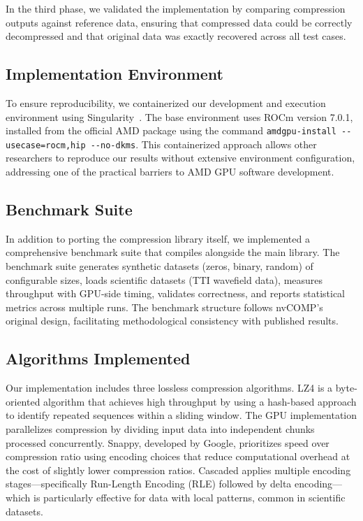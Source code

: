 \documentclass[runningheads]{llncs}
\begin{document}
In the third phase, we validated the implementation by comparing compression outputs against reference data, ensuring that compressed data could be correctly decompressed and that original data was exactly recovered across all test cases.

\subsection{Implementation Environment}

To ensure reproducibility, we containerized our development and execution environment using Singularity~\cite{singularity}. The base environment uses ROCm version 7.0.1, installed from the official AMD package using the command \texttt{amdgpu-install -{}-usecase=rocm,hip -{}-no-dkms}. This containerized approach allows other researchers to reproduce our results without extensive environment configuration, addressing one of the practical barriers to AMD GPU software development.

\subsection{Benchmark Suite}

In addition to porting the compression library itself, we implemented a comprehensive benchmark suite that compiles alongside the main library. The benchmark suite generates synthetic datasets (zeros, binary, random) of configurable sizes, loads scientific datasets (TTI wavefield data), measures throughput with GPU-side timing, validates correctness, and reports statistical metrics across multiple runs. The benchmark structure follows nvCOMP's original design, facilitating methodological consistency with published results.

\subsection{Algorithms Implemented}

Our implementation includes three lossless compression algorithms. LZ4 is a byte-oriented algorithm that achieves high throughput by using a hash-based approach to identify repeated sequences within a sliding window. The GPU implementation parallelizes compression by dividing input data into independent chunks processed concurrently. Snappy, developed by Google, prioritizes speed over compression ratio using encoding choices that reduce computational overhead at the cost of slightly lower compression ratios. Cascaded applies multiple encoding stages---specifically Run-Length Encoding (RLE) followed by delta encoding---which is particularly effective for data with local patterns, common in scientific datasets.
\end{document}
